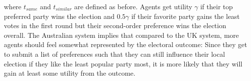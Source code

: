 \documentclass[12pt, a4paper]{article}
\begin{document}
 where $t_{same}$ and $t_{similar}$ are defined as before. Agents get utility $\gamma$ if their top preferred party wins the election and $0.5 \gamma$ if their favorite party gains the least votes in the first round but their second-order preference wins the election overall.
 The Australian system implies that compared to the UK system, more agents should feel somewhat represented by the electoral outcome: Since they get to submit a list of preferences such that they can still influence their local election if they like the least popular party most, it is more likely that they will gain at least some utility from the outcome.

\end{document}

